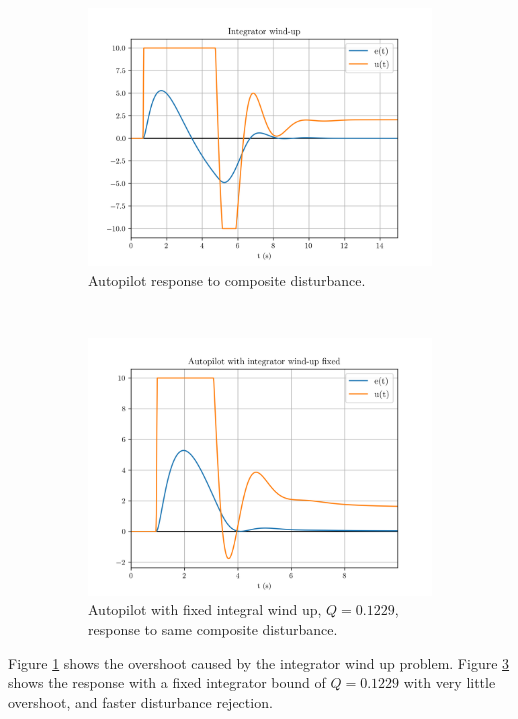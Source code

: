 \documentclass[8pt]{article}
\begin{document}
\begin{figure}[H]
    \centering
    \begin{subfigure}[t]{0.48\textwidth}
        \centering
        \includegraphics[width=1.0\textwidth]{figures/FIGURE_14.png}
        \caption{Autopilot response to composite disturbance.}
        \label{fig:figure14}
    \end{subfigure}
    ~
    \begin{subfigure}[t]{0.48\textwidth}
        \centering
        \includegraphics[width=1.0\textwidth]{figures/FIGURE_15.png}
        \caption{Autopilot with fixed integral wind up, $Q=0.1229$, response to same composite disturbance.}
        \label{fig:figure15}
    \end{subfigure}
    \caption{}
\end{figure}

Figure \ref{fig:figure14} shows the overshoot caused by the integrator wind up problem.
Figure \ref{fig:figure15} shows the response with a fixed integrator bound of $Q=0.1229$ with very little overshoot, and faster disturbance rejection.
\end{document}
